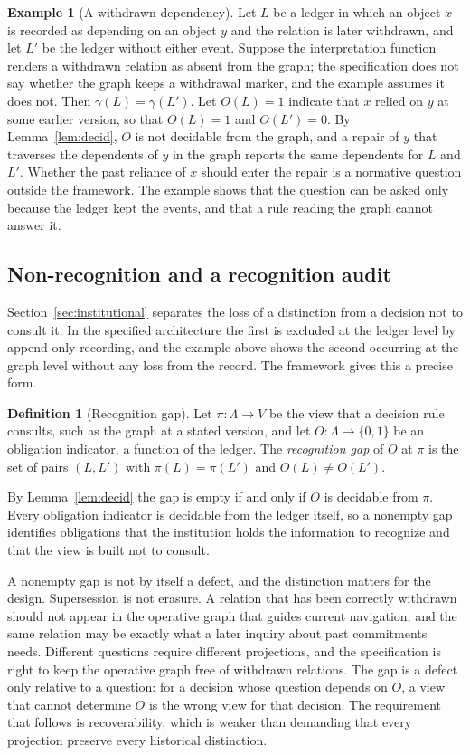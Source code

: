 \documentclass[11pt]{article}
\theoremstyle{definition}
\newtheorem{definition}{Definition}
\newtheorem{example}{Example}
\theoremstyle{remark}
\newcommand{\Bool}{\{0,1\}}
\begin{document}
\begin{example}[A withdrawn dependency]\label{ex:withdrawn}
Let $L$ be a ledger in which an object $x$ is recorded as depending on an object $y$ and the relation is later withdrawn, and let $L'$ be the ledger without either event. Suppose the interpretation function renders a withdrawn relation as absent from the graph; the specification does not say whether the graph keeps a withdrawal marker, and the example assumes it does not. Then $\gamma(L)=\gamma(L')$. Let $O(L)=1$ indicate that $x$ relied on $y$ at some earlier version, so that $O(L)=1$ and $O(L')=0$. By Lemma~\ref{lem:decid}, $O$ is not decidable from the graph, and a repair of $y$ that traverses the dependents of $y$ in the graph reports the same dependents for $L$ and $L'$. Whether the past reliance of $x$ should enter the repair is a normative question outside the framework. The example shows that the question can be asked only because the ledger kept the events, and that a rule reading the graph cannot answer it.
\end{example}

\subsection{Non-recognition and a recognition audit}

Section~\ref{sec:institutional} separates the loss of a distinction from a decision not to consult it. In the specified architecture the first is excluded at the ledger level by append-only recording, and the example above shows the second occurring at the graph level without any loss from the record. The framework gives this a precise form.

\begin{definition}[Recognition gap]\label{def:gap}
Let $\pi:\Lambda\to V$ be the view that a decision rule consults, such as the graph at a stated version, and let $O:\Lambda\to\Bool$ be an obligation indicator, a function of the ledger. The \emph{recognition gap} of $O$ at $\pi$ is the set of pairs $(L,L')$ with $\pi(L)=\pi(L')$ and $O(L)\ne O(L')$.
\end{definition}

By Lemma~\ref{lem:decid} the gap is empty if and only if $O$ is decidable from $\pi$. Every obligation indicator is decidable from the ledger itself, so a nonempty gap identifies obligations that the institution holds the information to recognize and that the view is built not to consult.

A nonempty gap is not by itself a defect, and the distinction matters for the design. Supersession is not erasure. A relation that has been correctly withdrawn should not appear in the operative graph that guides current navigation, and the same relation may be exactly what a later inquiry about past commitments needs. Different questions require different projections, and the specification is right to keep the operative graph free of withdrawn relations. The gap is a defect only relative to a question: for a decision whose question depends on $O$, a view that cannot determine $O$ is the wrong view for that decision. The requirement that follows is recoverability, which is weaker than demanding that every projection preserve every historical distinction.
\end{document}
